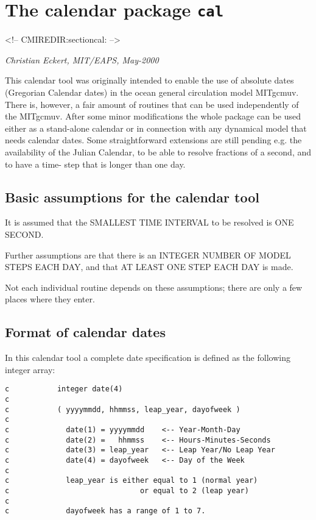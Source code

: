 \section{The calendar package \texttt{cal}
\label{sectioncal}}
\begin{rawhtml}
<!-- CMIREDIR:sectioncal: -->
\end{rawhtml}

\textit{Christian Eckert, MIT/EAPS, May-2000}

This calendar tool was originally intended to enable the use of
absolute dates (Gregorian Calendar dates) in the ocean general
circulation model MITgcmuv. There is, however, a fair amount of
routines that can be used independently of the MITgcmuv. After
some minor modifications the whole package can be used either
as a stand-alone calendar or in connection with any dynamical
model that needs calendar dates. Some straightforward extensions
are still pending e.g. the availability of the Julian Calendar,
to be able to resolve fractions of a second, and to have a time-
step that is longer than one day.

\subsection{Basic assumptions for the calendar tool}

    It is assumed that the SMALLEST TIME INTERVAL to be resolved is
    ONE SECOND.

    Further assumptions are that there is an INTEGER NUMBER OF
    MODEL STEPS EACH DAY, and that AT LEAST ONE STEP EACH DAY is
    made.

    Not each individual routine depends on these assumptions; there
    are only a few places where they enter.

\subsection{Format of calendar dates}

    In this calendar tool a complete date specification is defined
    as the following integer array:

\begin{verbatim}
c           integer date(4)
c
c           ( yyyymmdd, hhmmss, leap_year, dayofweek )
c
c             date(1) = yyyymmdd    <-- Year-Month-Day
c             date(2) =   hhmmss    <-- Hours-Minutes-Seconds
c             date(3) = leap_year   <-- Leap Year/No Leap Year
c             date(4) = dayofweek   <-- Day of the Week
c
c             leap_year is either equal to 1 (normal year)
c                              or equal to 2 (leap year)
c
c             dayofweek has a range of 1 to 7.
\end{verbatim}


